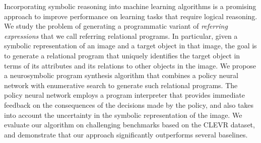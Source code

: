Incorporating symbolic reasoning into machine learning algorithms is a promising approach to improve performance on learning tasks that require logical reasoning. We study the problem of generating a programmatic variant of \emph{referring expressions} that we call referring relational programs. In particular, given a symbolic representation of an image and a target object in that image, the goal is to generate a relational program that uniquely identifies the target object in terms of its attributes and its relations to other objects in the image. We propose a neurosymbolic program synthesis algorithm that combines a policy neural network with enumerative search to generate such relational programs. The policy neural network employs a program interpreter that provides immediate feedback on the consequences of the decisions made by the policy, and also takes into account the uncertainty in the symbolic representation of the image. We evaluate our algorithm on challenging benchmarks based on the CLEVR dataset, and demonstrate that our approach significantly outperforms several baselines.